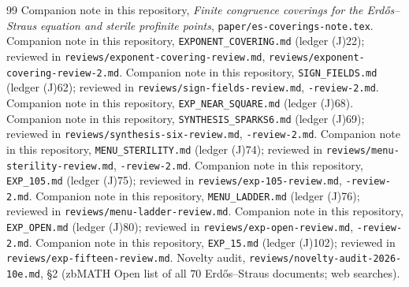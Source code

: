 \documentclass[11pt,reqno]{amsart}
\theoremstyle{definition}
\begin{document}
\begin{thebibliography}{99}
 Companion note in this repository,
\emph{Finite congruence coverings for the Erd\H{o}s--Straus equation and
sterile profinite points}, \texttt{paper/es-coverings-note.tex}.
 Companion note in this repository,
\texttt{EXPONENT\_COVERING.md} (ledger (J)22); reviewed in
\texttt{reviews/exponent-covering-review.md},
\texttt{reviews/exponent-covering-review-2.md}.
 Companion note in this repository,
\texttt{SIGN\_FIELDS.md} (ledger (J)62); reviewed in
\texttt{reviews/sign-fields-review.md}, \texttt{-review-2.md}.
 Companion note in this repository,
\texttt{EXP\_NEAR\_SQUARE.md} (ledger (J)68).
 Companion note in this repository,
\texttt{SYNTHESIS\_SPARKS6.md} (ledger (J)69); reviewed in
\texttt{reviews/synthesis-six-review.md}, \texttt{-review-2.md}.
 Companion note in this repository,
\texttt{MENU\_STERILITY.md} (ledger (J)74); reviewed in
\texttt{reviews/menu-sterility-review.md}, \texttt{-review-2.md}.
 Companion note in this repository, \texttt{EXP\_105.md}
(ledger (J)75); reviewed in \texttt{reviews/exp-105-review.md},
\texttt{-review-2.md}.
 Companion note in this repository,
\texttt{MENU\_LADDER.md} (ledger (J)76); reviewed in
\texttt{reviews/menu-ladder-review.md}.
 Companion note in this repository, \texttt{EXP\_OPEN.md}
(ledger (J)80); reviewed in \texttt{reviews/exp-open-review.md},
\texttt{-review-2.md}.
 Companion note in this repository, \texttt{EXP\_15.md}
(ledger (J)102); reviewed in \texttt{reviews/exp-fifteen-review.md}.
 Novelty audit, \texttt{reviews/novelty-audit-2026-10e.md},
\S2 (zbMATH Open list of all $70$ Erd\H{o}s--Straus documents; web searches).
\end{thebibliography}
\end{document}
